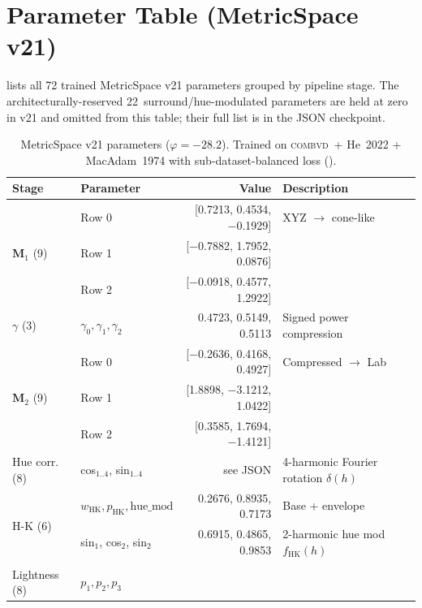\documentclass[11pt, twocolumn]{article}
\newcommand{\combvd}{\textsc{combvd}}
\begin{document}
\section{Parameter Table (MetricSpace v21)}
\label{app:params}

 lists all 72 trained MetricSpace v21 parameters
grouped by pipeline stage. The architecturally-reserved
22~surround/hue-modulated parameters are held at zero in v21 and
omitted from this table; their full list is in the JSON checkpoint.

\begin{table}[t]
  \centering
  \caption{MetricSpace v21 parameters ($\varphi = -28.2$\textdegree). Trained on \combvd\ + He~2022 + MacAdam~1974 with sub-dataset-balanced loss ().}
  \label{tab:params}
  \footnotesize
  \begin{tabular}{llrl}
    \toprule
    Stage & Parameter & Value & Description \\
    \midrule
    \multirow{3}{*}{$\mathbf{M}_1$ (9)}
      & Row 0 & [\phantom{$-$}0.7213, \phantom{$-$}0.4534, $-$0.1929] & XYZ $\to$ cone-like \\
      & Row 1 & [$-$0.7882, \phantom{$-$}1.7952, \phantom{$-$}0.0876] & \\
      & Row 2 & [$-$0.0918, \phantom{$-$}0.4577, \phantom{$-$}1.2922] & \\
    \midrule
    $\gamma$ (3) & $\gamma_0, \gamma_1, \gamma_2$ & 0.4723, 0.5149, 0.5113 & Signed power compression \\
    \midrule
    \multirow{3}{*}{$\mathbf{M}_2$ (9)}
      & Row 0 & [$-$0.2636, \phantom{$-$}0.4168, \phantom{$-$}0.4927] & Compressed $\to$ Lab \\
      & Row 1 & [\phantom{$-$}1.8898, $-$3.1212, \phantom{$-$}1.0422] & \\
      & Row 2 & [\phantom{$-$}0.3585, \phantom{$-$}1.7694, $-$1.4121] & \\
    \midrule
    Hue corr. (8) & cos$_{1..4}$, sin$_{1..4}$ & see JSON & 4-harmonic Fourier rotation $\delta(h)$ \\
    \midrule
    \multirow{3}{*}{H-K (6)}
      & $w_\mathrm{HK}, p_\mathrm{HK}, \mathrm{hue\_mod}$
        & 0.2676, 0.8935, 0.7173 & Base + envelope \\
      & sin$_1$, cos$_2$, sin$_2$
        & 0.6915, 0.4865, 0.9853 & 2-harmonic hue mod $f_\mathrm{HK}(h)$ \\
      & & & \\
    \midrule
    \multirow{3}{*}{Lightness (8)}
      & $p_1, p_2, p_3$

\end{tabular}
\end{table}
\end{document}
